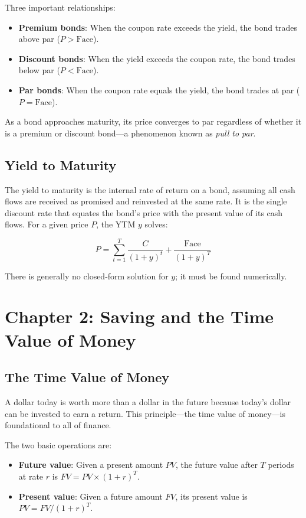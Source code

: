 \documentclass[11pt,letterpaper]{report}
\begin{document}
Three important relationships:

\begin{itemize}
  \item \textbf{Premium bonds}: When the coupon rate exceeds the yield, the bond trades above par ($P > \text{Face}$).
  \item \textbf{Discount bonds}: When the yield exceeds the coupon rate, the bond trades below par ($P < \text{Face}$).
  \item \textbf{Par bonds}: When the coupon rate equals the yield, the bond trades at par ($P = \text{Face}$).
\end{itemize}

As a bond approaches maturity, its price converges to par regardless of whether it is a premium or discount bond---a phenomenon known as \textit{pull to par}.

\section{Yield to Maturity}


The yield to maturity is the internal rate of return on a bond, assuming all cash flows are received as promised and reinvested at the same rate.  It is the single discount rate that equates the bond's price with the present value of its cash flows.  For a given price $P$, the YTM $y$ solves:

$$P = \sum_{t=1}^{T} \frac{C}{(1+y)^t} + \frac{\text{Face}}{(1+y)^T}$$

There is generally no closed-form solution for $y$; it must be found numerically.


\chapter{Chapter 2: Saving and the Time Value of Money}


\section{The Time Value of Money}


A dollar today is worth more than a dollar in the future because today's dollar can be invested to earn a return.  This principle---the time value of money---is foundational to all of finance.

The two basic operations are:

\begin{itemize}
  \item \textbf{Future value}: Given a present amount $PV$, the future value after $T$ periods at rate $r$ is $FV = PV \times (1+r)^T$.
  \item \textbf{Present value}: Given a future amount $FV$, its present value is $PV = FV / (1+r)^T$.
\end{itemize}
\end{document}

